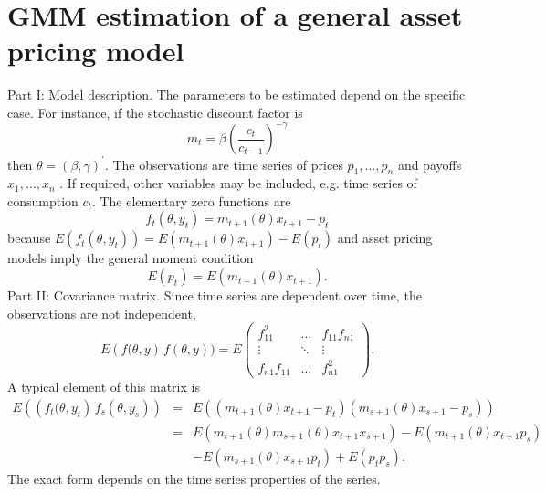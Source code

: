 \documentclass{article}
\begin{document}
\section{GMM estimation of a general asset pricing model}

Part I: Model description. The parameters to be estimated depend on the
specific case. For instance, if the stochastic discount factor is%
\begin{equation*}
m_{t}=\beta \left( \frac{c_{t}}{c_{t-1}}\right) ^{-\gamma }
\end{equation*}%
then $\theta =\left( \beta ,\gamma \right) ^{\prime }$. The observations are
time series of prices $p_{1},\ldots ,p_{n}$ and payoffs $x_{1},\ldots ,x_{n}$%
. If required, other variables may be included, e.g. time series of
consumption $c_{t}$. The elementary zero functions are%
\begin{equation*}
f_{t}\left( \theta ,y_{t}\right) =m_{t+1}\left( \theta \right) x_{t+1}-p_{t}
\end{equation*}%
because $E\left( f_{t}\left( \theta ,y_{t}\right) \right) =E\left(
m_{t+1}\left( \theta \right) x_{t+1}\right) -E\left( p_{t}\right) $ and
asset pricing models imply the general moment condition%
\begin{equation*}
E\left( p_{t}\right) =E\left( m_{t+1}\left( \theta \right) x_{t+1}\right) .
\end{equation*}%
Part II: Covariance matrix. Since time series are dependent over time, the
observations are not independent,%
\begin{equation*}
E\left( f(\theta ,y\right) \,f\left( \theta ,y\right) )=E\left(
\begin{array}{ccc}
f_{11}^{2} & \ldots & f_{11}f_{n1} \\
\vdots & \ddots & \vdots \\
f_{n1}f_{11} & \ldots & f_{n1}^{2}%
\end{array}%
\right) .
\end{equation*}%
A typical element of this matrix is%
\begin{eqnarray*}
E\left( \left( f_{t}(\theta ,y_{t}\right) \,f_{s}\left( \theta ,y_{s}\right)
\right) &=&E\left( \left( m_{t+1}\left( \theta \right) x_{t+1}-p_{t}\right)
\left( m_{s+1}\left( \theta \right) x_{s+1}-p_{s}\right) \right) \\
&=&E\left( m_{t+1}\left( \theta \right) m_{s+1}\left( \theta \right)
x_{t+1}x_{s+1}\right) -E\left( m_{t+1}\left( \theta \right)
x_{t+1}p_{s}\right) \\
&&-E\left( m_{s+1}\left( \theta \right) x_{s+1}p_{t}\right) +E\left(
p_{t}p_{s}\right) .
\end{eqnarray*}%
The exact form depends on the time series properties of the series.
\end{document}
